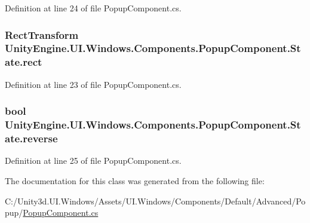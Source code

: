 Definition at line 24 of file Popup\+Component.\+cs.

\hypertarget{class_unity_engine_1_1_u_i_1_1_windows_1_1_components_1_1_popup_component_1_1_state_ae4c102dfc5ff08b49b9952cfb71754a2}{}
\subsubsection[{rect}]{\setlength{\rightskip}{0pt plus 5cm}Rect\+Transform Unity\+Engine.\+U\+I.\+Windows.\+Components.\+Popup\+Component.\+State.\+rect}\label{class_unity_engine_1_1_u_i_1_1_windows_1_1_components_1_1_popup_component_1_1_state_ae4c102dfc5ff08b49b9952cfb71754a2}


Definition at line 23 of file Popup\+Component.\+cs.

\hypertarget{class_unity_engine_1_1_u_i_1_1_windows_1_1_components_1_1_popup_component_1_1_state_a0bc1cd458984d40a301106bcd400205f}{}
\subsubsection[{reverse}]{\setlength{\rightskip}{0pt plus 5cm}bool Unity\+Engine.\+U\+I.\+Windows.\+Components.\+Popup\+Component.\+State.\+reverse}\label{class_unity_engine_1_1_u_i_1_1_windows_1_1_components_1_1_popup_component_1_1_state_a0bc1cd458984d40a301106bcd400205f}


Definition at line 25 of file Popup\+Component.\+cs.



The documentation for this class was generated from the following file\+:\begin{DoxyCompactItemize}
\item 
C\+:/\+Unity3d.\+U\+I.\+Windows/\+Assets/\+U\+I.\+Windows/\+Components/\+Default/\+Advanced/\+Popup/\hyperlink{_popup_component_8cs}{Popup\+Component.\+cs}\end{DoxyCompactItemize}
